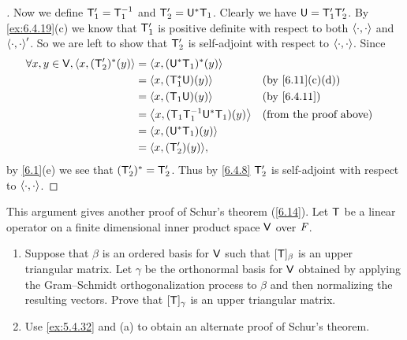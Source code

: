 \begin{proof}[]
  Now we define \(\mathsf{T}_1' = \mathsf{T}_1^{-1}\) and \(\mathsf{T}_2' = \mathsf{U}^* \mathsf{T}_1\).
  Clearly we have \(\mathsf{U} = \mathsf{T}_1' \mathsf{T}_2'\).
  By \cref{ex:6.4.19}(c) we know that \(\mathsf{T}_1'\) is positive definite with respect to both \(\left\langle\cdot, \cdot\right\rangle\) and \(\left\langle\cdot, \cdot\right\rangle'\).
  So we are left to show that \(\mathsf{T}_2'\) is self-adjoint with respect to \(\left\langle\cdot, \cdot\right\rangle\).
  Since
  \begin{align*}
    \forall x, y \in \V, \inn{x, (\T_2')^*(y)} & = \inn{x, (\U^* \T_1)^*(y)}                                                 \\
                                               & = \inn{x, (\T_1^* \U)(y)}                &  & \by{6.11}[c,d]                \\
                                               & = \inn{x, (\T_1 \U)(y)}                  &  & \by{6.4.11}                   \\
                                               & = \inn{x, (\T_1 \T_1^{-1} \U^* \T_1)(y)} &  & \text{(from the proof above)} \\
                                               & = \inn{x, (\U^* \T_1)(y)}                                                   \\
                                               & = \inn{x, (\T_2')(y)},
  \end{align*}
  by \cref{6.1}(e) we see that \((\mathsf{T}_2')^* = \mathsf{T}_2'\).
  Thus by \cref{6.4.8} \(\mathsf{T}_2'\) is self-adjoint with respect to \(\left\langle\cdot, \cdot\right\rangle\).
\end{proof}

\begin{ex}\label{ex:6.4.24}
  This argument gives another proof of Schur's theorem (\cref{6.14}).
  Let \(\mathsf{T}\) be a linear operator on a finite dimensional inner product space \(\mathsf{V}\) over \(\mathit{F}\).
  \begin{enumerate}
    \item Suppose that \(\beta\) is an ordered basis for \(\mathsf{V}\) such that \([\mathsf{T}]_{\beta}\) is an upper triangular matrix.
          Let \(\gamma\) be the orthonormal basis for \(\mathsf{V}\) obtained by applying the Gram--Schmidt orthogonalization process to \(\beta\) and then normalizing the resulting vectors.
          Prove that \([\mathsf{T}]_{\gamma}\) is an upper triangular matrix.
    \item Use \cref{ex:5.4.32} and (a) to obtain an alternate proof of Schur's theorem.
  \end{enumerate}
\end{ex}

